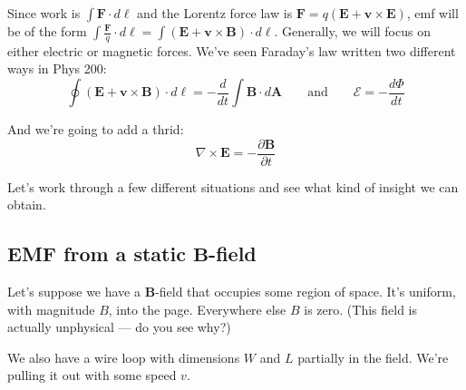 \documentclass{article}
\numberwithin{equation}{section}
\begin{document}
Since work is $\displaystyle \int \bm{F} \cdot d\bm{\ell}$ and the Lorentz force law is $\displaystyle \bm{F} = q \left( \bm{E} + \bm{v} \times \bm{E} \right)$, emf will be of the form $\displaystyle \int \frac{\bm{F}}{q} \cdot d\bm{\ell} = \int \left( \bm{E} + \bm{v} \times \bm{B} \right) \cdot d\bm{\ell}$. Generally, we will focus on either electric or magnetic forces. We've seen Faraday's law written two different ways in Phys 200:
\begin{equation*}
    \oint \left( \bm{E} + \bm{v} \times \bm{B} \right) \cdot d\bm{\ell} = -\frac{d}{dt} \int \bm{B} \cdot d\bm{A} \qquad \text{and} \qquad \mathcal{E} = -\frac{d \Phi}{dt}
\end{equation*}

And we're going to add a thrid:
\begin{equation*}
    \nabla \times \bm{E} = -\frac{\partial \bm{B}}{\partial t}
\end{equation*}


Let's work through a few different situations and see what kind of insight we can obtain.

\subsection*{EMF from a static $\bm{B}$-field}

Let's suppose we have a $\bm{B}$-field that occupies some region of space. It's uniform, with magnitude $B$, into the page. Everywhere else $B$ is zero. (This field is actually unphysical --- do you see why?)

We also have a wire loop with dimensions $W$ and $L$ partially in the field. We're pulling it out with some speed $v$.
\end{document}
